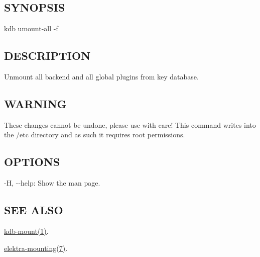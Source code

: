 \subsection*{S\+Y\+N\+O\+P\+S\+IS}

{\ttfamily kdb umount-\/all -\/f}

\subsection*{D\+E\+S\+C\+R\+I\+P\+T\+I\+ON}

Unmount all backend and all global plugins from key database.

\subsection*{W\+A\+R\+N\+I\+NG}

These changes cannot be undone, please use with care! This command writes into the {\ttfamily /etc} directory and as such it requires root permissions.

\subsection*{O\+P\+T\+I\+O\+NS}


\begin{DoxyItemize}
\item {\ttfamily -\/H}, {\ttfamily -\/-\/help}\+: Show the man page.
\end{DoxyItemize}

\subsection*{S\+EE A\+L\+SO}


\begin{DoxyItemize}
\item \hyperlink{doc_help_kdb-mount_md}{kdb-\/mount(1)}.
\item \hyperlink{doc_help_elektra-mounting_md}{elektra-\/mounting(7)}. 
\end{DoxyItemize}